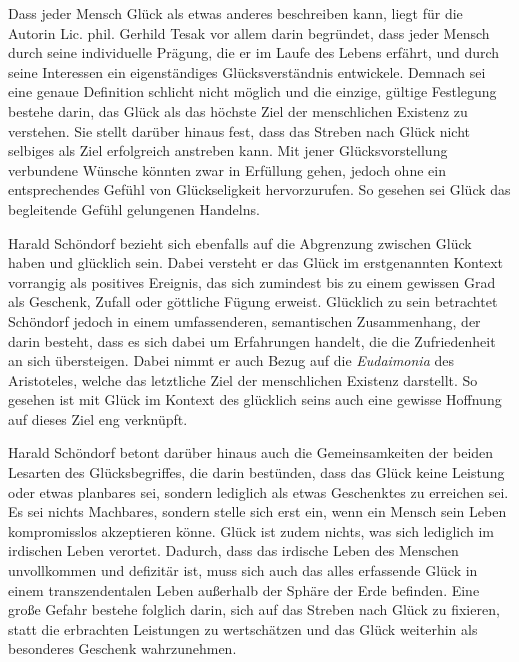 Dass jeder Mensch Glück als etwas anderes beschreiben kann, liegt für die Autorin Lic. phil. Gerhild Tesak vor allem  darin begründet, dass jeder Mensch durch seine individuelle Prägung, die er im Laufe des Lebens erfährt, und durch seine Interessen ein eigenständiges Glücksverständnis entwickele.
Demnach sei eine genaue Definition schlicht nicht möglich und die einzige, gültige Festlegung bestehe darin, das Glück als das höchste Ziel der menschlichen Existenz zu verstehen. 
 Sie stellt darüber hinaus fest, dass das Streben nach Glück nicht selbiges als Ziel erfolgreich anstreben kann. 
 Mit jener Glücksvorstellung verbundene Wünsche könnten zwar in Erfüllung gehen, jedoch ohne ein entsprechendes Gefühl von Glückseligkeit hervorzurufen\cite{GT16}.
 So gesehen sei Glück \glqq das begleitende Gefühl gelungenen Handelns\grqq{}.
 
Harald Schöndorf bezieht sich ebenfalls auf die Abgrenzung zwischen \glqq Glück haben\grqq{} und \glqq glücklich sein\grqq{}. 
Dabei versteht er das Glück im erstgenannten Kontext vorrangig als positives Ereignis, das sich \glqq zumindest bis zu einem gewissen Grad als Geschenk, Zufall oder göttliche Fügung erweist.\grqq{} 
Glücklich zu sein betrachtet Schöndorf jedoch in einem umfassenderen, semantischen Zusammenhang, der darin besteht, dass es sich dabei um Erfahrungen handelt, die die Zufriedenheit an sich übersteigen. 
Dabei nimmt er auch Bezug auf die \textit{Eudaimonia} des Aristoteles, welche das letztliche Ziel der menschlichen Existenz darstellt. 
So gesehen ist mit Glück im Kontext des \glqq glücklich seins\grqq{} auch eine gewisse Hoffnung auf dieses Ziel eng verknüpft.

Harald Schöndorf betont darüber hinaus auch die Gemeinsamkeiten der beiden Lesarten des Glücksbegriffes, die darin bestünden, dass das Glück keine Leistung oder etwas planbares sei, sondern lediglich als etwas Geschenktes zu erreichen sei. 
Es sei nichts Machbares, sondern stelle sich erst ein, wenn ein Mensch sein Leben kompromisslos akzeptieren könne\cite{WB13, S.175}.
Glück ist zudem nichts, was sich lediglich im irdischen Leben verortet. 
Dadurch, dass das irdische Leben des Menschen unvollkommen und defizitär ist, muss sich auch das alles erfassende Glück in einem transzendentalen Leben außerhalb der Sphäre der Erde befinden. 
Eine große Gefahr bestehe folglich darin, sich auf das Streben nach Glück zu fixieren, statt die erbrachten Leistungen zu wertschätzen und das Glück weiterhin als besonderes Geschenk wahrzunehmen\cite{WB13, S.175}.

